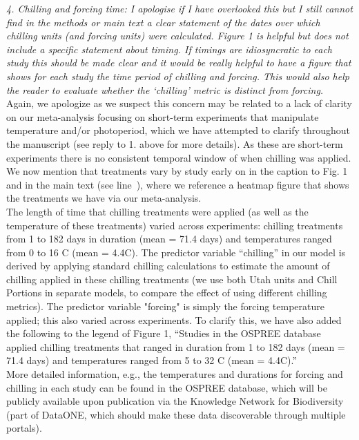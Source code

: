 \documentclass[11pt, a4paper]{article}
\newcommand{\lr}[1]{line~\lineref{#1}}
\begin{document}
\emph{4. Chilling and forcing time: I apologise if I have overlooked this but I still cannot find in the
methods or main text a clear statement of the dates over which chilling units (and forcing
units) were calculated. Figure 1 is helpful but does not include a specific statement about
timing. If timings are idiosyncratic to each study this should be made clear and it would be
really helpful to have a figure that shows for each study the time period of chilling and forcing.
This would also help the reader to evaluate whether the `chilling' metric is distinct from
forcing.}\\

Again, we apologize as we suspect this concern may be related to a lack of clarity on our meta-analysis focusing on short-term experiments that manipulate temperature and/or photoperiod, which we have attempted to clarify throughout the manuscript (see reply to 1. above for more details). As these are short-term experiments there is no consistent temporal window of when chilling was applied. We now mention that treatments vary by study early on in the caption to Fig. 1 and in the main text (see \lr{heatmap}), where we reference a heatmap figure that shows the treatments we have via our meta-analysis.\\ 

The length of time that chilling treatments were applied (as well as the temperature of these treatments) varied across experiments: chilling treatments from 1 to 182 days in duration (mean = 71.4 days) and temperatures ranged from  0 to 16 \degree C (mean = 4.4\degree C). The predictor variable ``chilling'' in our model is derived by applying standard chilling calculations to estimate the amount of chilling applied in these chilling treatments (we use both Utah units and Chill Portions in separate models, to compare the effect of using different chilling metrics). The predictor variable "forcing" is simply the forcing temperature applied; this also varied across experiments. 
To clarify this, we have also added the following to the legend of Figure 1, ``Studies in the OSPREE database applied chilling treatments that ranged in duration from 1 to 182 days (mean = 71.4 days) and temperatures ranged from  5 to 32 \degree C (mean = 4.4\degree C).''\\ %

More detailed information, e.g., the temperatures and durations for forcing and chilling in each study can be found in the OSPREE database, which will be publicly available upon publication via the Knowledge Network for Biodiversity (part of DataONE, which should make these data discoverable through multiple portals). \\
\end{document}
